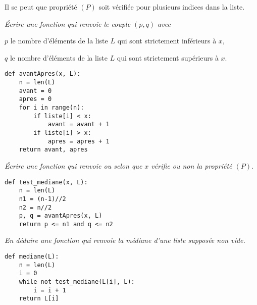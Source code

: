 Il se peut que propriété $(P)$ soit vérifiée pour plusieurs indices dans la liste.
\begin{Exercise}\it Écrire une fonction  qui renvoie le couple $(p,q)$ avec

$p$ le nombre d'éléments de la liste $L$ qui sont strictement inférieurs à $x$,

$q$ le nombre d'éléments de la liste $L$ qui sont strictement supérieurs à $x$.

\end{Exercise}
\begin{Answer} 
\begin{lstlisting}
def avantApres(x, L):
    n = len(L)
    avant = 0
    apres = 0
    for i in range(n):
        if liste[i] < x:
            avant = avant + 1
        if liste[i] > x:
            apres = apres + 1
    return avant, apres
\end{lstlisting}
\end{Answer}
\begin{Exercise}\it Écrire une fonction  qui renvoie  ou  selon que $x$ vérifie ou non la propriété $(P).$

\end{Exercise}
\begin{Answer} 
\begin{lstlisting}
def test_mediane(x, L):
    n = len(L)
    n1 = (n-1)//2
    n2 = n//2
    p, q = avantApres(x, L)
    return p <= n1 and q <= n2
\end{lstlisting}
\end{Answer}
\begin{Exercise}\it En déduire une fonction  qui renvoie la médiane d'une liste supposée non vide.
\end{Exercise} 
\begin{Answer} 
\begin{lstlisting}
def mediane(L):
    n = len(L)
    i = 0
    while not test_mediane(L[i], L):
        i = i + 1
    return L[i]
\end{lstlisting}
\end{Answer}
